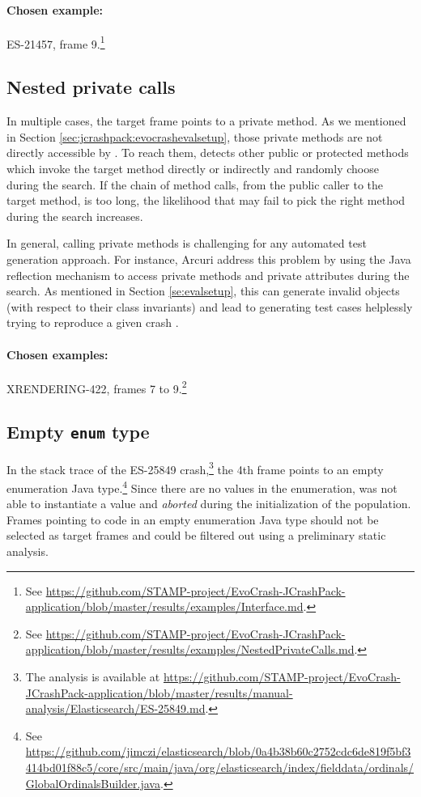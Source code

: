 \paragraph{Chosen example:}
ES-21457, frame 9.\footnote{See \url{https://github.com/STAMP-project/EvoCrash-JCrashPack-application/blob/master/results/examples/Interface.md}.}


\subsection{Nested private calls}

In multiple cases, the target frame points to a private method. As we mentioned in Section \ref{sec:jcrashpack:evocrashevalsetup}, those private methods are not directly accessible by \evocrash. 
To reach them, \evocrash detects other public or protected methods which invoke the target method directly or indirectly and randomly choose during the search. 
If the chain of method calls, from the public caller to the target method, is too long, the likelihood that \evocrash may fail to pick the right method during the search increases.

In general, calling private methods is challenging for any automated test generation approach.
For instance, Arcuri \etal \cite{arcuri2017private} address this problem by using the Java reflection mechanism to access private methods and private attributes during the search. 
As mentioned in Section \ref{se:evalsetup}, this can generate invalid objects (with respect to their class invariants) and lead to generating test cases helplessly trying to reproduce a given crash \cite{Chen2015}.

\paragraph{Chosen examples:} 
XRENDERING-422, frames 7 to 9.\footnote{See \url{https://github.com/STAMP-project/EvoCrash-JCrashPack-application/blob/master/results/examples/NestedPrivateCalls.md}.}


\subsection{Empty \texttt{enum} type}

In the stack trace of the ES-25849 crash,\footnote{The analysis is available at \url{https://github.com/STAMP-project/EvoCrash-JCrashPack-application/blob/master/results/manual-analysis/Elasticsearch/ES-25849.md}.} 
the 4th frame points to an empty enumeration Java type.\footnote{See \url{https://github.com/jimczi/elasticsearch/blob/0a4b38b60c2752cdc6de819f5bf3414bd01f88c5/core/src/main/java/org/elasticsearch/index/fielddata/ordinals/GlobalOrdinalsBuilder.java}.} 
Since there are no values in the enumeration, \evocrash was not able to instantiate a value and \emph{aborted} during the initialization of the population.
Frames pointing to code in an empty enumeration Java type should not be selected as target frames and could be filtered out using a preliminary static analysis.


